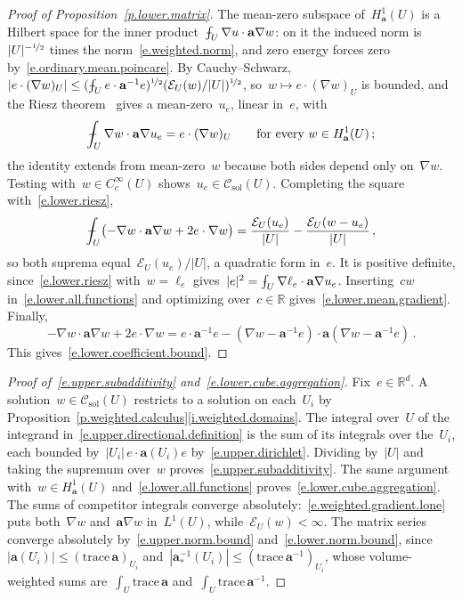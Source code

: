 \documentclass[11pt,letterpaper]{article}
\numberwithin{equation}{section}
\theoremstyle{definition}
\newcommand{\R}{\mathbb{R}}
\newcommand{\Rd}{\mathbb{R}^d}
\renewcommand{\a}{\mathbf{a}}
\newcommand{\nf}{\nicefrac}
\newcommand*{\tr}{\mathrm{trace\,}}
\newcommand{\Ener}{\mathcal E}
\newcommand{\Csol}{\mathcal C_{\mathrm{sol}}}
\def\Xint#1{\mathchoice
	{\XXint\displaystyle\textstyle{#1}}%
	{\XXint\textstyle\scriptstyle{#1}}%
	{\XXint\scriptstyle\scriptscriptstyle{#1}}%
	{\XXint\scriptscriptstyle\scriptscriptstyle{#1}}%
	\!\int}
\def\XXint#1#2#3{{\setbox0=\hbox{$#1{#2#3}{\int}$}
		\vcenter{\hbox{$#2#3$}}\kern-.5\wd0}}
\def\fint{\Xint-}
\begin{document}
\begin{proof}[Proof of Proposition~\ref{p.lower.matrix}]
The mean-zero subspace of~$H^1_\a(U)$ is a Hilbert space for the inner product~$\fint_U\nabla u\cdot\a\nabla w$: on it the induced norm is~$|U|^{-\nf12}$ times the norm~\eqref{e.weighted.norm}, and zero energy forces zero by~\eqref{e.ordinary.mean.poincare}. By Cauchy--Schwarz,~$|e\cdot(\nabla w)_U|\leq(\fint_Ue\cdot\a^{-1}e)^{\nf12}(\Ener_U(w)/|U|)^{\nf12}$, so~$w\mapsto e\cdot(\nabla w)_U$ is bounded, and the Riesz theorem~\cite[Theorem C.24]{Ern.Guermond.hilbert} gives a mean-zero~$u_e$, linear in~$e$, with
\begin{equation}
	\fint_U\nabla w\cdot\a\nabla u_e=e\cdot(\nabla w)_U\qquad\mbox{for every }w\in H^1_\a(U)\,;
	\label{e.lower.riesz}
\end{equation}
the identity extends from mean-zero~$w$ because both sides depend only on~$\nabla w$. Testing with~$w\in C^\infty_c(U)$ shows~$u_e\in\Csol(U)$. Completing the square with~\eqref{e.lower.riesz},
\begin{equation*}
	\fint_U\bigl(-\nabla w\cdot\a\nabla w+2e\cdot\nabla w\bigr)=\frac{\Ener_U(u_e)}{|U|}-\frac{\Ener_U(w-u_e)}{|U|}\,,
\end{equation*}
so both suprema equal~$\Ener_U(u_e)/|U|$, a quadratic form in~$e$. It is positive definite, since~\eqref{e.lower.riesz} with~$w=\ell_e$ gives~$|e|^2=\fint_U\nabla\ell_e\cdot\a\nabla u_e$. Inserting~$cw$ in~\eqref{e.lower.all.functions} and optimizing over~$c\in\R$ gives~\eqref{e.lower.mean.gradient}. Finally,
\begin{equation*}
	-\nabla w\cdot\a\nabla w+2e\cdot\nabla w=e\cdot\a^{-1}e-(\nabla w-\a^{-1}e)\cdot\a(\nabla w-\a^{-1}e)\,.
\end{equation*}
This gives~\eqref{e.lower.coefficient.bound}.
\end{proof}

\begin{proof}[Proof of~\eqref{e.upper.subadditivity} and~\eqref{e.lower.cube.aggregation}]
Fix~$e\in\Rd$. A solution~$w\in\Csol(U)$ restricts to a solution on each~$U_i$ by Proposition~\ref{p.weighted.calculus}\ref{i.weighted.domains}. The integral over~$U$ of the integrand in~\eqref{e.upper.directional.definition} is the sum of its integrals over the~$U_i$, each bounded by~$|U_i|\,e\cdot\a(U_i)e$ by~\eqref{e.upper.dirichlet}. Dividing by~$|U|$ and taking the supremum over~$w$ proves~\eqref{e.upper.subadditivity}. The same argument with~$w\in H^1_\a(U)$ and~\eqref{e.lower.all.functions} proves~\eqref{e.lower.cube.aggregation}. The sums of competitor integrals converge absolutely:~\eqref{e.weighted.gradient.lone} puts both~$\nabla w$ and~$\a\nabla w$ in~$L^1(U)$, while~$\Ener_U(w)<\infty$. The matrix series converge absolutely by~\eqref{e.upper.norm.bound} and~\eqref{e.lower.norm.bound}, since~$|\a(U_i)|\leq(\tr\a)_{U_i}$ and~$|\a_*^{-1}(U_i)|\leq(\tr\a^{-1})_{U_i}$, whose volume-weighted sums are~$\int_U\tr\a$ and~$\int_U\tr\a^{-1}$.
\end{proof}
\end{document}
